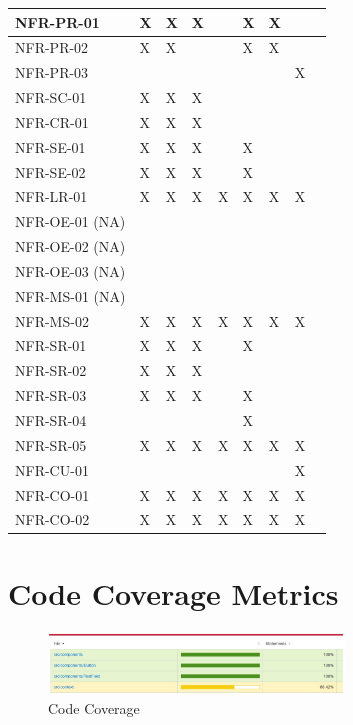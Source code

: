 \documentclass[12pt, titlepage]{article}
\begin{document}
\begin{longtable}{|p{3.5cm}|p{1cm}|p{1cm}|p{1cm}|p{1cm}|p{1cm}|p{1cm}|p{1cm}|p{1cm}}
    NFR-PR-01  & X & X & X &  & X & X &  \\\hline
    NFR-PR-02  & X & X &  &  & X & X &  \\\hline
    NFR-PR-03  &  &  &  &  &  &  & X \\\hline
    NFR-SC-01  & X & X & X &  &  &  &  \\\hline
    NFR-CR-01  & X & X & X &  &  &  &  \\\hline
    NFR-SE-01  & X & X & X &  & X &  &  \\\hline
    NFR-SE-02  & X & X & X &  & X &  &  \\\hline
    NFR-LR-01  & X & X & X & X & X & X & X \\\hline
    NFR-OE-01 (NA) &  &  &  &  &  &  &  \\\hline
    NFR-OE-02  (NA) &  &  &  &  &  &  &  \\\hline
    NFR-OE-03  (NA) &  &  &  &  &  &  &  \\\hline
    NFR-MS-01 (NA) &  &  &  &  &  &  &  \\\hline
    NFR-MS-02  & X & X & X & X & X & X & X \\\hline
    NFR-SR-01  & X & X & X &  & X &  &  \\\hline
    NFR-SR-02  & X & X & X &  &  &  &  \\\hline
    NFR-SR-03  & X & X & X &  & X &  &  \\\hline
    NFR-SR-04  &  &  &  &  & X &  &  \\\hline
    NFR-SR-05  & X & X & X & X & X & X & X \\\hline
    NFR-CU-01  &  &  &  &  &  &  & X \\\hline
    NFR-CO-01  & X & X & X & X & X & X & X \\\hline
    NFR-CO-02  & X & X & X & X & X & X & X \\\hline
    
    \hline
\end{longtable}

\section{Code Coverage Metrics}

\begin{figure}[h]
  \centering
  \includegraphics[width=0.7\textwidth]{cc.jpg}
  \caption{Code Coverage}
  \label{FigUH}
  \end{figure}
\end{document}
